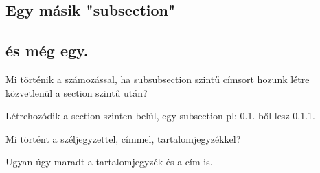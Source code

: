 \documentclass[twocolumn]{book}
\begin{document}
\subsection{Egy másik "subsection"}
\subsection{és még egy.}


\newpage

{
Mi történik a számozással, ha subsubsection szintű címsort hozunk létre
közvetlenül a section szintű után? \par
Létrehozódik a section szinten belül, egy subsection pl: 0.1.-ből lesz 0.1.1.

Mi történt a széljegyzettel, címmel, tartalomjegyzékkel? \par
Ugyan úgy maradt a tartalomjegyzék és a cím is.
}
\end{document}
